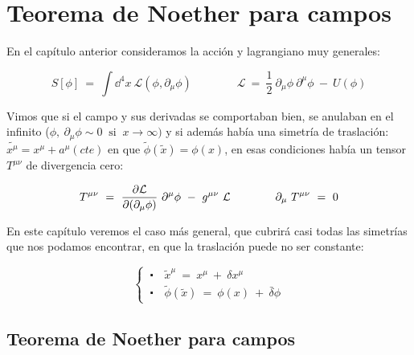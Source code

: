\chapter{Teorema de Noether para campos}



\vspace{10mm}
\begin{adjustwidth}{50pt}{50pt}
\begin{ejemplo}
En el capítulo anterior consideramos la acción y lagrangiano muy generales:

$$ S[\phi] \ =\  \displaystyle \int \dd^4 x \ \mathcal L(\phi, \partial_\mu \phi) \qquad \qquad  \mathcal L\ = \ \dfrac 1 2  \ \partial_\mu \phi \ \partial^\mu \phi \ - \ U(\phi) $$

Vimos que si el campo y sus derivadas se comportaban bien, se anulaban en el infinito ($\phi,\ \partial_\mu \phi \sim 0 \ \text{ si } \ x\to \infty)$ y si además había una simetría de traslación: $\tilde{x^\mu}=x^\mu+a^\mu (cte)$ en que $\tilde \phi(\tilde x)=\phi(x)$, en esas condiciones había un tensor $T^{\mu \nu}$ de divergencia cero:

$$T^{\mu \nu} \ = \ \displaystyle \pdv{\mathcal L}{(\partial_\mu \phi)} \ \partial^\mu \phi \ - \ g^{\mu \nu} \ \mathcal L \qquad  \qquad \partial_\mu \ T^{\mu \nu} \ = \ 0$$

En este capítulo veremos el caso más general, que cubrirá casi todas las simetrías que nos podamos encontrar, en que la traslación puede no ser constante:

\vspace{-5mm}
$$\begin{cases} \ \centerdot \quad  \tilde x^\mu  \ = \ x^\mu \ + \ \delta x^\mu \\  \ \centerdot \quad  \tilde \phi (\tilde x) \ = \ \phi(x) \ + \ \bar \delta \phi   \end{cases}$$

\vspace{3mm}

\end{ejemplo}
\end{adjustwidth}

\vspace{5mm}
\section{Teorema de Noether para campos}

